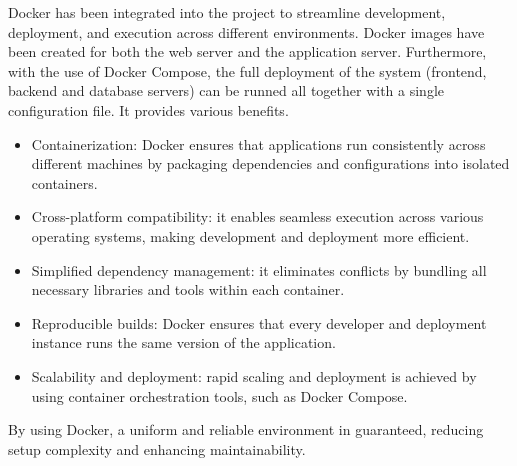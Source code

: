 Docker has been integrated into the project to streamline development, deployment, and execution across different environments.
Docker images have been created for both the web server and the application server.
Furthermore, with the use of Docker Compose, the full deployment of the system (frontend, backend and database servers) can be runned all together with a single configuration file.
It provides various benefits.

\begin{itemize}

    \item Containerization: Docker ensures that applications run consistently across different machines by packaging dependencies and configurations into isolated containers.
    \item Cross-platform compatibility: it enables seamless execution across various operating systems, making development and deployment more efficient.
    \item Simplified dependency management: it eliminates conflicts by bundling all necessary libraries and tools within each container.
    \item Reproducible builds: Docker ensures that every developer and deployment instance runs the same version of the application.
    \item Scalability and deployment: rapid scaling and deployment is achieved by using container orchestration tools, such as Docker Compose.

\end{itemize}

By using Docker, a uniform and reliable environment in guaranteed, reducing setup complexity and enhancing maintainability.
